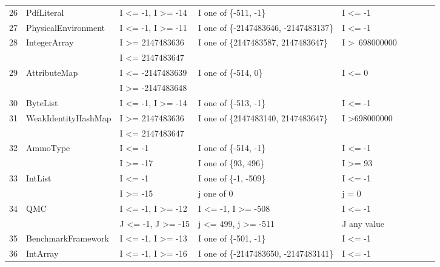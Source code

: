 \documentclass[runningheads,a4paper]{llncs}
\begin{document}
\begin{table}[h]
{{\begin{tabular}{|l|l|l|l|l|l|l|l|l|}
26	& PdfLiteral					& I \textless= -1, I \textgreater= -14			& I one of \{-511, -1\}					& I \textless= -1						\\ 
27	& PhysicalEnvironment		& I \textless= -1, I \textgreater= -11			& I one of \{-2147483646, -2147483137\}	& I \textless= -1						\\ 
28	& IntegerArray				& I \textgreater= 2147483636				& I one of \{2147483587, 2147483647\}	& I \textgreater~698000000			\\ 
	&                                             & I \textless= 2147483647					& 										&  			   						\\	
29	& AttributeMap				& I \textless= -2147483639					& I one of \{-514, 0\}						& I \textless= 0						\\ 
	&                                             & I \textgreater= -2147483648				& 										&  			   						\\	
30	& ByteList					& I \textless= -1, I \textgreater= -14			& I one of \{-513, -1\}	 				& I \textless= -1						\\ 
31	& WeakIdentityHashMap		& I \textgreater= 2147483636				& I one of \{2147483140, 2147483647\}	& I \textgreater 698000000			\\ 
	&                                             & I \textless= 2147483647					& 										&  			   						\\
32	& AmmoType				& I \textless= -1								& I one of \{-514, -1\}					& I \textless= -1 					\\ 			
	&                                             & I \textgreater= -17							& I one of \{93, 496\}						& I \textgreater= 93		   			\\
33	& IntList						& I \textless= -1								& I one of \{-1, -509\}					& I \textless= -1						\\ 		
	&                                             & I \textgreater= -15							& j one of {0}								& j = 0		   						\\
34	& QMC						& I \textless= -1, I \textgreater= -12			& I \textless= -1, I \textgreater= -508		& I \textless= -1						\\ 
	&                                             & J \textless= -1, J \textgreater= -15			& j \textless= 499, j \textgreater= -511	& J any value			 		  		\\	
35	& BenchmarkFramework		& I \textless= -1, I \textgreater= -13			& I one of \{-501, -1\}					& I \textless= -1						\\ 
36	& IntArray					& I \textless= -1, I \textgreater= -16			& I one of \{-2147483650, -2147483141\}	& I \textless= -1						\\ 

\end{tabular}}}
\end{table}
\end{document}

